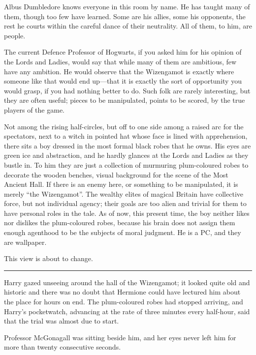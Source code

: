 Albus Dumbledore knows everyone in this room by name. He has taught many
of them, though too few have learned. Some are his allies, some his
opponents, the rest he courts within the careful dance of their
neutrality. All of them, to him, are people.

The current Defence Professor of Hogwarts, if you asked him for his
opinion of the Lords and Ladies, would say that while many of them are
ambitious, few have any ambition. He would observe that the Wizengamot
is exactly where someone like that would end up---that it is exactly the
sort of opportunity you would grasp, if you had nothing better to do.
Such folk are rarely interesting, but they are often useful; pieces to
be manipulated, points to be scored, by the true players of the game.

Not among the rising half-circles, but off to one side among a raised
arc for the spectators, next to a witch in pointed hat whose face is
lined with apprehension, there sits a boy dressed in the most formal
black robes that he owns. His eyes are green ice and abstraction, and he
hardly glances at the Lords and Ladies as they bustle in. To him they
are just a collection of murmuring plum-coloured robes to decorate the
wooden benches, visual background for the scene of the Most Ancient
Hall. If there is an enemy here, or something to be manipulated, it is
merely ``the Wizengamot''. The wealthy elites of magical Britain have
collective force, but not individual agency; their goals are too alien
and trivial for them to have personal roles in the tale. As of now, this
present time, the boy neither likes nor dislikes the plum-coloured
robes, because his brain does not assign them enough agenthood to be the
subjects of moral judgment. He is a PC, and they are wallpaper.

This view is about to change.

\begin{center}\rule{3in}{0.4pt}\end{center}

Harry gazed unseeing around the hall of the Wizengamot; it looked quite
old and historic and there was no doubt that Hermione could have
lectured him about the place for hours on end. The plum-coloured robes
had stopped arriving, and Harry's pocketwatch, advancing at the rate of
three minutes every half-hour, said that the trial was almost due to
start.

Professor McGonagall was sitting beside him, and her eyes never left him
for more than twenty consecutive seconds.

